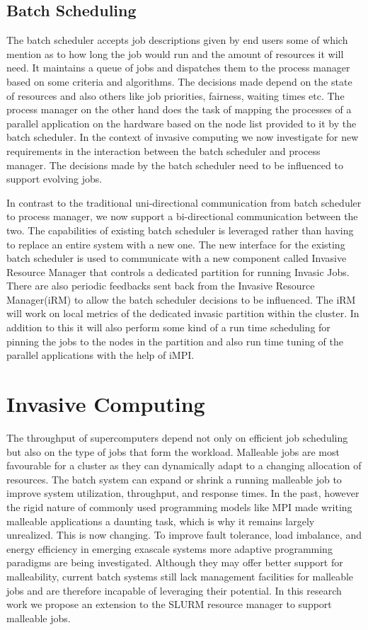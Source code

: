 \documentclass{acm_proc_article-sp}
\begin{document}
\subsection{Batch Scheduling}
The batch scheduler accepts job descriptions given by end users some of which mention as to how long the job would run and the amount of resources it will need. It maintains a queue of jobs and dispatches them to the process manager based on some criteria and algorithms. The decisions made depend on the state of resources and also others like job priorities, fairness, waiting times etc. The process manager on the other hand does the task of mapping the processes of a parallel application on the hardware based on the node list provided to it by the batch scheduler. In the context of invasive computing we now investigate for new requirements in the interaction between the batch scheduler and process manager. The decisions made by the batch scheduler need to be influenced to support evolving jobs.\par
\noindent
In contrast to the traditional uni-directional communication from batch scheduler to process manager, we now support a bi-directional communication between the two. The capabilities of existing batch scheduler is leveraged rather than having to replace an entire system with a new one. The new interface for the existing batch scheduler is used to communicate with a new component called Invasive Resource Manager that controls a dedicated partition for running Invasic Jobs. There are also periodic feedbacks sent back from the Invasive Resource Manager(iRM) to allow the batch scheduler decisions to be influenced. The iRM will work on local metrics of the dedicated invasic partition within the cluster. In addition to this it will also perform some kind of a run time scheduling for pinning the jobs to the nodes in the partition and also run time tuning of the parallel applications with the help of iMPI.\par
\section{Invasive Computing}
The throughput of supercomputers depend not only on efficient job scheduling but also on the type of jobs that form the workload. Malleable jobs are most favourable for a cluster as they can dynamically adapt to a changing allocation of resources. The batch system can expand or shrink a running malleable job to improve system utilization, throughput, and response times. In the past, however the rigid nature of commonly used programming models like MPI made writing malleable applications a daunting task, which is why it remains largely unrealized. This is now changing. To improve fault tolerance, load imbalance, and energy efficiency in emerging exascale systems more adaptive programming paradigms are being investigated. Although they may offer better support for malleability, current batch systems still lack management facilities for malleable jobs and are therefore incapable of leveraging their potential. In this research work we propose an extension to the SLURM resource manager to support malleable jobs.
\end{document}
